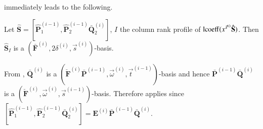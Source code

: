  immediately leads
to the following. 
\begin{lem}
\label{lem:computationAtTopLevel}Let $\hat{\mathbf{S}}=[\hat{\mathbf{P}}_{1}^{\left(i-1\right)},\hat{\mathbf{P}}_{2}^{\left(i-1\right)}\bar{\mathbf{Q}}_{2}^{\left(i\right)}]$,
$I$ the column rank profile of $\operatorname{lcoeff}(x^{\vec{s}^{\left(i\right)}}\hat{\mathbf{S}})$.
Then $\hat{\mathbf{S}}_{I}$ is a $(\bar{\mathbf{F}}^{\left(i\right)},2\delta^{\left(i\right)},\vec{s}^{\left(i\right)})$-basis.\end{lem}
\begin{pf}
From , $\bar{\mathbf{Q}}^{\left(i\right)}$
is a $(\check{\mathbf{F}}^{\left(i\right)}\bar{\mathbf{P}}^{\left(i-1\right)},\vec{\omega}^{\left(i\right)},\vec{t}^{\left(i-1\right)})$-basis
and hence $\bar{\mathbf{P}}^{\left(i-1\right)}\bar{\mathbf{Q}}^{\left(i\right)}$
is a $(\check{\mathbf{F}}^{\left(i\right)},\vec{\omega}^{\left(i\right)},\vec{s}^{\left(i-1\right)})$-basis.
Therefore  applies since $[\hat{\mathbf{P}}_{1}^{\left(i-1\right)},\hat{\mathbf{P}}_{2}^{\left(i-1\right)}\bar{\mathbf{Q}}_{2}^{\left(i\right)}]=\mathbf{E}^{\left(i\right)}\bar{\mathbf{P}}^{\left(i-1\right)}\bar{\mathbf{Q}}^{\left(i\right)}$.
%
\begin{comment}
$=\mathbf{E}^{\left(i\right)}[\bar{\mathbf{P}}_{1}^{\left(i-1\right)},\bar{\mathbf{P}}_{2}^{\left(i-1\right)}\bar{\mathbf{Q}}_{2}^{\left(i\right)}]$ 
\end{comment}
{}\end{pf}
